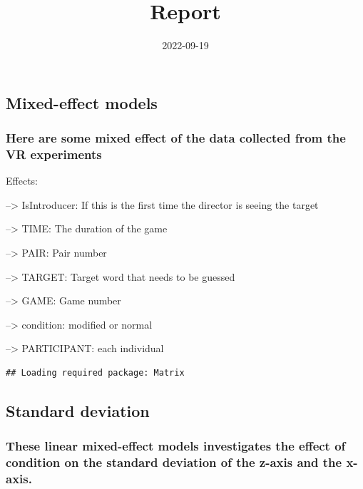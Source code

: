 \documentclass[
]{article}
\title{Report}
\author{}
\date{\vspace{-2.5em}2022-09-19}
\begin{document}
\maketitle

\hypertarget{mixed-effect-models}{%
\subsection{Mixed-effect models}\label{mixed-effect-models}}

\hypertarget{here-are-some-mixed-effect-of-the-data-collected-from-the-vr-experiments}{%
\subsubsection{Here are some mixed effect of the data collected from the
VR
experiments}\label{here-are-some-mixed-effect-of-the-data-collected-from-the-vr-experiments}}

Effects:

--\textgreater{} IsIntroducer: If this is the first time the director is
seeing the target

--\textgreater{} TIME: The duration of the game

--\textgreater{} PAIR: Pair number

--\textgreater{} TARGET: Target word that needs to be guessed

--\textgreater{} GAME: Game number

--\textgreater{} condition: modified or normal

--\textgreater{} PARTICIPANT: each individual

\begin{verbatim}
## Loading required package: Matrix
\end{verbatim}

\hypertarget{standard-deviation}{%
\subsection{Standard deviation}\label{standard-deviation}}

\hypertarget{these-linear-mixed-effect-models-investigates-the-effect-of-condition-on-the-standard-deviation-of-the-z-axis-and-the-x-axis.}{%
\subsubsection{These linear mixed-effect models investigates the effect
of condition on the standard deviation of the z-axis and the
x-axis.}\label{these-linear-mixed-effect-models-investigates-the-effect-of-condition-on-the-standard-deviation-of-the-z-axis-and-the-x-axis.}}
\end{document}
